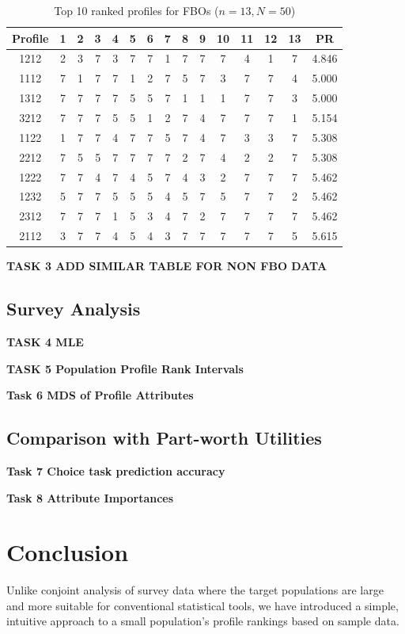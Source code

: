 \documentclass[a4paper, 12pt]{article}
\begin{document}
\begin{table}[!htpb]
\scriptsize
\centering
\begin{tabular}{c|ccccc|ccccc|ccc|c}
Profile& 1 & 2 & 3 & 4 & 5 & 6&7&8&9&10&11&12&13&PR\\\hline
1212& 2&	3&	7&	3&	7&	7&	1&	7&	7&	7&	4&	1&	7&	4.846\\
1112&7	&1	&7	&7	&1	&2	&7	&5	&7	&3	&7	&7	&4	&5.000\\
1312&7	&7	&7	&7	&5	&5	&7	&1	&1	&1	&7	&7	&3	&5.000\\
3212&7	&7	&7	&5	&5	&1	&2	&7	&4	&7	&7	&7	&1	&5.154\\
1122&1	&7	&7	&4	&7	&7	&5	&7	&4	&7	&3	&3	&7	&5.308\\
2212&7	&5	&5	&7	&7	&7	&7	&2	&7	&4	&2	&2	&7	&5.308\\
1222&7	&7	&4	&7	&4	&5	&7	&4	&3	&2	&7	&7	&7	&5.462\\
1232&5	&7	&7	&5	&5	&5	&4	&5	&7	&5	&7	&7	&2	&5.462\\
2312&7	&7	&7	&1	&5	&3	&4	&7	&2	&7	&7	&7	&7	&5.462\\
2112&3	&7	&7	&4	&5	&4	&3	&7	&7	&7	&7	&7	&5	&5.615\\\hline
\end{tabular}
\caption{{\small Top 10 ranked profiles for FBOs ($n=13,N=50$) }   }
\label{Tab13}
\end{table}

{\bf TASK 3 ADD SIMILAR TABLE FOR NON FBO DATA}


\subsection{Survey Analysis}
{\bf TASK 4 MLE}



{\bf TASK 5 Population Profile Rank Intervals}



{\bf Task 6 MDS of Profile Attributes }


\subsection{Comparison with Part-worth Utilities}

{\bf Task 7 Choice task prediction accuracy}

{\bf Task 8 Attribute Importances}




\section{Conclusion}
Unlike conjoint analysis of survey data where the target populations are large and more suitable for conventional statistical tools, we have introduced a simple, intuitive approach to a small population's profile rankings based on sample data. 
\end{document}
